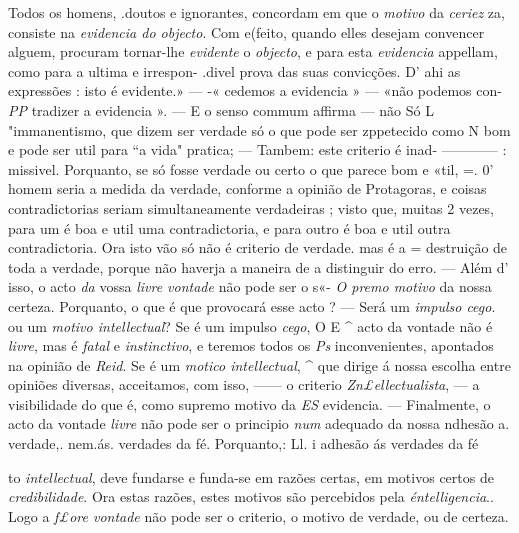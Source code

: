 Todos os homens, .doutos e ignorantes, concordam em que o \emph{motivo} da    \emph{ceriez} za, consiste na \emph{evidencia do objecto}. Com e(feito, quando elles desejam convencer alguem, procuram tornar-lhe \emph{evidente} o \emph{objecto},   e para esta \emph{evidencia} appellam, como para a ultima e irrespon- .divel prova das suas convicções. D' ahi as expressões : isto é   evidente.» --- -« cedemos a evidencia » --- «não podemos con- \emph{PP} tradizer a evidencia ». --- E o senso commum affirma --- não Só L "immanentismo, que dizem ser verdade só o que pode ser zppetecido como N bom e pode ser util para “a vida" pratica; --- Tambem: este criterio é inad- ------------ : missivel. Porquanto, se só fosse verdade ou certo o que parece bom e «til, =. 0' homem seria a medida da verdade, conforme a opinião de Protagoras, e \textbar{} coisas contradictorias seriam simultaneamente verdadeiras ; visto que, muitas 2 vezes, para um é boa e util uma contradictoria, e para outro é boa e util outra contradictoria. Ora isto vão só não é criterio de verdade. mas é a = destruição de toda a verdade, porque não haverja a maneira de a distinguir do erro. --- Além d' isso, o acto \emph{da} vossa \emph{livre vontade} não pode ser o s«- \emph{O premo motivo} da nossa certeza. Porquanto, o que é que provocará esse acto ? --- Será um \emph{impulso cego}. ou um \emph{motivo intellectual}? Se é um impulso \emph{cego}, O E \textasciicircum{} acto da vontade não é \emph{livre}, mas é \emph{fatal} e \emph{instinctivo}, e teremos todos os \emph{Ps} inconvenientes, apontados na opinião de \emph{Reid}. Se é um \emph{motico intellectual}, \textasciicircum{} que dirige á nossa escolha entre opiniões diversas, acceitamos, com isso, ------ o criterio \emph{Zn£ellectualista}, --- a visibilidade do que é, como supremo motivo da \emph{ES} evidencia. --- Finalmente, o acto da vontade \emph{livre} não pode ser o principio \emph{num} adequado da nossa ndhesão a. verdade,. nem.ás. verdades da fé. Porquanto,: Ll. i adhesão ás verdades da fé

to \emph{intellectual}, deve fundarse e funda-se em razões certas, em motivos certos de \emph{credibilidade}. Ora estas razões, estes motivos são percebidos pela \emph{éntelligencia}.. Logo a \emph{f£ore vontade} não pode ser o criterio, o motivo de verdade, ou de certeza.


